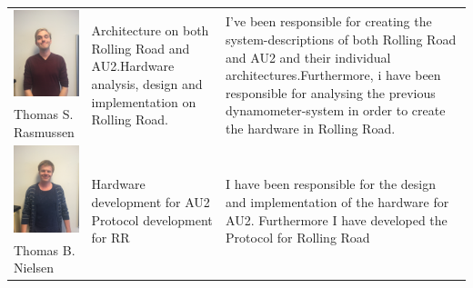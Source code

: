 \begin{tabular}[c]{|p{3cm}| p{5cm} | p{6cm}|}
	\phantom{Test}
	\includegraphics[width=3cm]{Introduction/TeamPictures/ThomasR} & \multirow{2}{5cm}{Architecture on both Rolling Road and AU2.\newline \newline Hardware analysis, design and implementation on Rolling Road.} & \multirow{2}{6cm}{I've been responsible for creating the system-descriptions of both Rolling Road and AU2 and their individual architectures.\newline \newline Furthermore, i have been responsible for analysing the previous dynamometer-system in order to create the hardware in Rolling Road.} \\
	Thomas S. \newline Rasmussen & & \\ \hline
		
	\phantom{Test}
	\includegraphics[width=3cm]{Introduction/TeamPictures/ThomasN} & \multirow{2}{5cm}{Hardware development for AU2 \newline \newline Protocol development for RR} & \multirow{2}{6cm}{I have been responsible for the design and implementation of the hardware for AU2. Furthermore I have developed the Protocol for Rolling Road} \\
	Thomas B. \newline Nielsen & & \\ \hline
\end{tabular}
